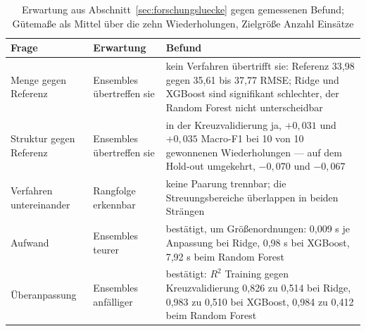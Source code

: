 \begin{table}[H]
\centering
\caption{Erwartung aus Abschnitt~\ref{sec:forschungsluecke} gegen gemessenen Befund; Gütemaße als Mittel über die zehn Wiederholungen, Zielgröße Anzahl Einsätze}
\label{tab:erwartung}
\footnotesize
\singlespacing
\setlength{\tabcolsep}{4pt}
\begin{tabularx}{\textwidth}{@{}>{\raggedright\arraybackslash}p{2.4cm} >{\raggedright\arraybackslash}p{3.5cm} >{\raggedright\arraybackslash}X@{}}
\toprule
\textbf{Frage} & \textbf{Erwartung} & \textbf{Befund} \\
\midrule
Menge gegen Referenz & Ensembles übertreffen sie & kein Verfahren übertrifft sie: Referenz 33,98 gegen 35,61 bis 37,77 RMSE; Ridge und XGBoost sind signifikant schlechter, der Random Forest nicht unterscheidbar \\
\addlinespace
Struktur gegen Referenz & Ensembles übertreffen sie & in der Kreuzvalidierung ja, $+0{,}031$ und $+0{,}035$ Macro-F1 bei 10 von 10 gewonnenen Wiederholungen --- auf dem Hold-out umgekehrt, $-0{,}070$ und $-0{,}067$ \\
\addlinespace
Verfahren untereinander & Rangfolge erkennbar & keine Paarung trennbar; die Streuungsbereiche überlappen in beiden Strängen \\
\addlinespace
Aufwand & Ensembles teurer & bestätigt, um Größenordnungen: 0,009 s je Anpassung bei Ridge, 0,98 s bei XGBoost, 7,92 s beim Random Forest \\
\addlinespace
Überanpassung & Ensembles anfälliger & bestätigt: $R^2$ Training gegen Kreuzvalidierung 0,826 zu 0,514 bei Ridge, 0,983 zu 0,510 bei XGBoost, 0,984 zu 0,412 beim Random Forest \\
\bottomrule
\end{tabularx}
\end{table}


